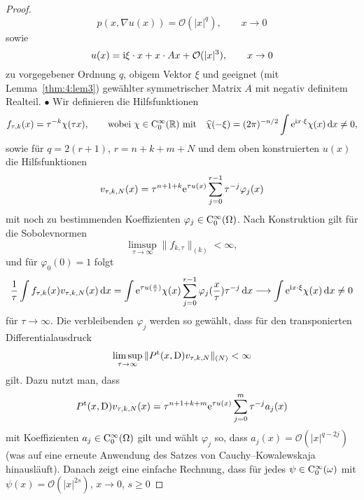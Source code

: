 \begin{proof}
\begin{equation}
    p(x,\nabla u(x)) = \mathcal O(|x|^q),\qquad x\to0
\end{equation}
sowie
\begin{equation}
   u(x) = \mathrm i \xi\cdot x + x\cdot Ax + \mathcal O(|x|^3),\qquad x\to0 
\end{equation}
zu vorgegebener Ordnung $q$, obigem Vektor $\xi$ und geeignet (mit Lemma~\ref{thm:4:lem3}) gewählter symmetrischer Matrix $A$ mit negativ definitem Realteil. 
%
$\bullet$ Wir definieren die Hilfsfunktionen
\begin{equation}
   f_{\tau, k}(x) = \tau^{-k} \chi(\tau x),\qquad \text{wobei $\chi\in\mathrm C_0^\infty(\mathbb R)$ mit}\quad \widehat \chi(-\xi) = (2\pi)^{-n/2}  \int \mathrm e^{\mathrm i x\cdot\xi} \chi(x) \,\mathrm d x \ne 0,
\end{equation}
sowie für $q=2(r+1)$, $r=n+k+m+N$ und dem oben konstruierten $u(x)$ die Hilfsfunktionen
\begin{equation}
   v_{\tau,k,N} (x) = \tau^{n+1+k} \mathrm e^{\tau u(x)} \sum_{j=0}^{r-1} \tau^{-j} \varphi_j(x) 
\end{equation}
mit noch zu bestimmenden Koeffizienten $\varphi_j\in\mathrm C_0^\infty(\Omega)$. Nach Konstruktion gilt für die Sobolevnormen
\begin{equation}\label{eq:cond1}
    \limsup_{\tau\to\infty} \| f_{k,\tau}\|_{(k)} < \infty,
\end{equation}
und für $\varphi_0(0)=1$ folgt
\begin{equation}\label{eq:cond3}
   \frac1\tau \int f_{\tau,k}(x) v_{\tau,k,N}(x)\,\mathrm d x = \int \mathrm e^{\tau u(\frac x\tau)} \chi(x) \sum_{j=0}^{r-1} \varphi_j(\frac x\tau) \tau^{-j} \,\mathrm d x \longrightarrow \int \mathrm e^{\mathrm i x\cdot\xi}\chi(x)\,\mathrm d x\ne0
\end{equation}
für $\tau\to\infty$. Die verbleibenden $\varphi_j$ werden so gewählt, dass für den transponierten Differentialausdruck
\begin{equation}\label{eq:cond2}
   \limsup_{\tau\to\infty} \|P^{\mathrm t}(x,\mathrm D) v_{\tau,k,N}\|_{(N)} <\infty 
\end{equation}
gilt. Dazu nutzt man, dass 
\begin{equation}
P^{\mathrm t}(x,\mathrm D) v_{\tau,k,N}(x)=\tau^{n+1+k+m}  \mathrm e^{\tau u(x)} \sum_{j=0}^m \tau^{-j} a_j(x) 
\end{equation}
mit Koeffizienten $a_j\in\mathrm C_0^\infty(\Omega)$ gilt und wählt $\varphi_j$ so, dass $a_j(x)=\mathcal O(|x|^{q-2j})$ (was auf eine erneute Anwendung des Satzes von Cauchy--Kowalewskaja hinausläuft). Danach zeigt eine einfache Rechnung, dass für jedes $\psi\in\mathrm C_0^\infty(\omega)$ mit $\psi(x)=\mathcal O(|x|^{2s})$, $x\to0$, $s\geq 0$

\end{proof}
